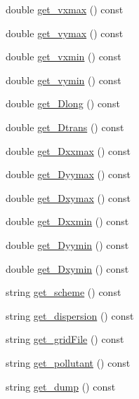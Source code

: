 \begin{DoxyCompactItemize}
double \hyperlink{class_simulation_parameters_a4c1f68d7b6c1171914b14746e72e1aeb}{get\+\_\+vxmax} () const 
\item 
double \hyperlink{class_simulation_parameters_a7b16803d329c7487313123a4939be4fd}{get\+\_\+vymax} () const 
\item 
double \hyperlink{class_simulation_parameters_a3fd57d0fbabac8276a67ffe47e187a7a}{get\+\_\+vxmin} () const 
\item 
double \hyperlink{class_simulation_parameters_a82fdd4554487c44608ec8481e2238a99}{get\+\_\+vymin} () const 
\item 
double \hyperlink{class_simulation_parameters_a3b0ff9c4b88fb8c112bc6fbd69a43363}{get\+\_\+\+Dlong} () const 
\item 
double \hyperlink{class_simulation_parameters_ae5fc90d369cbb210e31d6e052bf77a6d}{get\+\_\+\+Dtrans} () const 
\item 
double \hyperlink{class_simulation_parameters_ad3de01622aedae26ca32c92efa82b164}{get\+\_\+\+Dxxmax} () const 
\item 
double \hyperlink{class_simulation_parameters_a3f6624fc83d5fd91e8c70cfb3a73e5f4}{get\+\_\+\+Dyymax} () const 
\item 
double \hyperlink{class_simulation_parameters_a61cf0e0d8c8713825c38f130fcb64c74}{get\+\_\+\+Dxymax} () const 
\item 
double \hyperlink{class_simulation_parameters_aab1156e02ae3d3f48dd77e47481ece90}{get\+\_\+\+Dxxmin} () const 
\item 
double \hyperlink{class_simulation_parameters_a4c66a266c6943fa10afef74b8332002a}{get\+\_\+\+Dyymin} () const 
\item 
double \hyperlink{class_simulation_parameters_ab63e1bb54a319885139aace910da678c}{get\+\_\+\+Dxymin} () const 
\item 
string \hyperlink{class_simulation_parameters_aac4e34a1ab864d4b0c076a45b74fb98d}{get\+\_\+scheme} () const 
\item 
string \hyperlink{class_simulation_parameters_a2d8b7ca6c945714efeef2916b2caaeb3}{get\+\_\+dispersion} () const 
\item 
string \hyperlink{class_simulation_parameters_aee24f2305aca60bc8d4c4182333abce3}{get\+\_\+grid\+File} () const 
\item 
string \hyperlink{class_simulation_parameters_a23dc711ac13c3929910efd5c9877e414}{get\+\_\+pollutant} () const 
\item 
string \hyperlink{class_simulation_parameters_ab396fcc5b261e17f81760e1846fc1569}{get\+\_\+dump} () const 

\end{DoxyCompactItemize}

